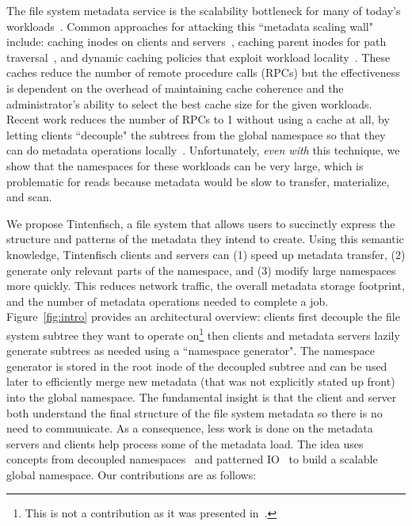 The file system metadata service is the scalability bottleneck for many of
today's workloads~\cite{roselli:atec2000-FS-workloads,
abad:techreport2012-fstrace, abad:ucc2012-mimesis,
alam:pdsw2011-metadata-scaling, weil:osdi2006-ceph}.  Common approaches for
attacking this ``metadata scaling wall" include: caching inodes on clients and
servers~\cite{depardon:tech13-survey, sinnamohideen:atc2010-ursa,
hildebrand:msst2005-pnfs, devulapalli:ipdps07-pvfs2, welch:fast2008-panasas},
caching parent inodes for path traversal~\cite{patil:fast2011-giga+,
ren:sc2014-indexfs, brandt:msst2003-lh, weil:sc2004-dyn-metadata,
ren:sc2014-indexfs}, and dynamic caching policies that exploit workload
locality~\cite{xing:sc2009-skyfs, zhu:pds2008-hba, li:msst2006-dynamic}.  These
caches reduce the number of remote procedure calls (RPCs) but the effectiveness
is dependent on the overhead of maintaining cache coherence and the
administrator's ability to select the best cache size for the given workloads.
Recent work reduces the number of RPCs to 1 without using a cache at all, by
letting clients ``decouple" the subtrees from the global namespace so that they
can do metadata operations locally~\cite{zheng:pdsw2015-deltafs,
sevilla:ipdps18-cudele}.  Unfortunately, {\it even with} this technique, we
show that the namespaces for these workloads can be very large, which is
problematic for reads because metadata would be slow to transfer, materialize,
and scan.

We propose Tintenfisch, a file system that allows users to succinctly express
the structure and patterns of the metadata they intend to create.  Using this
semantic knowledge, Tintenfisch clients and servers can (1) speed up metadata
transfer, (2) generate only relevant parts of the namespace, and (3) modify
large namespaces more quickly. This reduces network traffic, the overall
metadata storage footprint, and the number of metadata operations needed to
complete a job. Figure~\ref{fig:intro} provides an architectural overview:
clients first decouple the file system subtree they want to operate
on\footnote{This is not a contribution as it was presented
in~\cite{sevilla:ipdps18-cudele}.} then clients and metadata servers lazily
generate subtrees as needed using a ``namespace generator". The namespace
generator is stored in the root inode of the decoupled subtree and can be used
later to efficiently merge new metadata (that was not explicitly stated up
front) into the global namespace. %
The fundamental insight is that the client and server both understand the final
structure of the file system metadata so there is no need to communicate.  As a
consequence, less work is done on the metadata servers and clients help process
some of the metadata load.  The idea uses concepts from decoupled
namespaces~\cite{zheng:pdsw2014-batchfs, zheng:pdsw2015-deltafs} and patterned
IO~\cite{he:hpdc13-plfs-patterns} to build a scalable global namespace. 
Our contributions are as follows:


